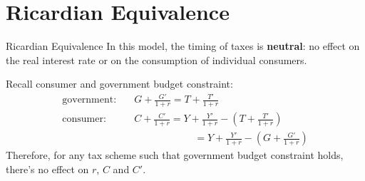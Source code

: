 \documentclass[11pt,aspectratio=43,usenames,dvipsnames]{beamer}
\theoremstyle{definition}
\begin{document}
\section{Ricardian Equivalence}
\label{sec:Ricardian_Equivalence}

\begin{frame}{Ricardian Equivalence}
\label{slide:Ricardian_Equivalence}
    In this model, the timing of taxes is \textbf{neutral}: no effect on the real interest rate or on the consumption of individual consumers.

    Recall consumer and government budget constraint:
    \begin{align*}
        \text{government}: \quad
            & G + \frac{G'}{1+r} = T + \frac{T'}{1+r}
        \\
        \text{consumer}: \quad
            & C + \frac{C'}{1+r} = Y + \frac{Y'}{1+r} - \left( T + \frac{T'}{1+r} \right)
        \\
            &  \qquad \qquad \qquad = Y + \frac{Y'}{1+r} - \left( G + \frac{G'}{1+r} \right)
    \end{align*}
    Therefore, for any tax scheme such that government budget constraint holds, there's no effect on $ r $, $ C $ and $ C' $.
\end{frame}
\end{document}
